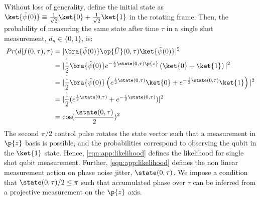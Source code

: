 Without loss of generality, define the initial state as  $\ket{\tilde{\psi} (0)} \equiv \frac{1}{\sqrt{2}} \ket{0} + \frac{1}{\sqrt{2}} \ket{1}$ in the rotating frame. Then, the probability of measuring the same state after time $\tau$ in a single shot measurement, $d_n \in \{0, 1\}$, is:
\begin{align} 
Pr(d | f(0, \tau), \tau) & = |\bra{\tilde{\psi} (0)} \op{\tilde{U}}(0, \tau) \ket{\tilde{\psi} (0)}|^2 \\
& = |\frac{1}{2} \bra{\tilde{\psi} (0)} e^{-\frac{i}{2} \state(0, \tau) \p{z} } \left(  \ket{0} + \ket{1} \right)|^2 \\
& = |\frac{1}{2}  \bra{\tilde{\psi} (0)} \left( e^{\frac{i}{2} \state(0, \tau) }\ket{0} + e^{-\frac{i}{2} \state(0, \tau)}\ket{1} \right)|^2\\
& = |\frac{1}{2}  ( e^{\frac{i}{2} \state(0, \tau)} + e^{-\frac{i}{2} \state(0, \tau)} )|^2\\
& = \cos(\frac{\state(0, \tau)}{2})^2 \label{eqn:app:likelihood}
\end{align}
The second $\pi/2$ control pulse rotates the state vector such that a measurement in $\p{z}$ basis is possible, and the probabilities correspond to observing the qubit in the   $\ket{1}$ state. Hence, \cref{eqn:app:likelihood} defines the likelihood for single shot qubit measurement. Further, \cref{eqn:app:likelihood} defines the non linear measurement action on phase noise jitter, $\state(0, \tau)$.  We impose a condition that $\state(0, \tau)/2 \leq \pi$  such that accumulated phase over $\tau$ can be inferred from a projective measurement on the $\p{z}$ axis. 


